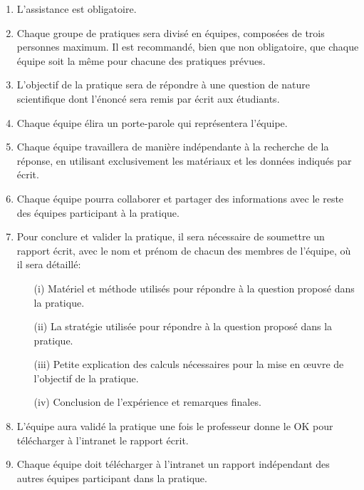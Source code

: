 \documentclass[a4paper,addpoints,12pt,answers]{exam}
\begin{document}
\begin{enumerate}
\item L’assistance est obligatoire.
\item Chaque groupe de pratiques sera divisé en équipes, composées de trois personnes maximum. Il est recommandé, bien que non obligatoire, que chaque équipe soit la même pour chacune des pratiques prévues.
\item L'objectif de la pratique sera de répondre à une question de nature scientifique dont l'énoncé sera remis par écrit aux étudiants.
\item Chaque équipe élira un porte-parole qui représentera l'équipe.
\item Chaque équipe travaillera de manière indépendante à la recherche de la réponse, en utilisant exclusivement les matériaux et les données indiqués par écrit.
\item Chaque équipe pourra collaborer et partager des informations avec le reste des équipes participant à la pratique.
\item Pour conclure et valider la pratique, il sera nécessaire de soumettre un rapport écrit, avec le nom et prénom de chacun des membres de l'équipe, où il sera détaillé:
\begin{enumerate}
\item[(i)] Matériel et méthode utilisés pour répondre à la question proposé dans la pratique.
\item[(ii)] La stratégie utilisée pour répondre à la question proposé dans la pratique.
\item[(iii)] Petite explication des calculs nécessaires pour la mise en œuvre de l'objectif de la pratique.
\item[(iv)] Conclusion de l'expérience et remarques finales.
\end{enumerate}  
\item L'équipe aura validé la pratique une fois le professeur donne le OK pour télécharger à l'intranet le rapport écrit.
\item Chaque équipe doit télécharger à l'intranet un rapport indépendant des autres équipes participant dans la pratique.
\end{enumerate}
\end{document}

